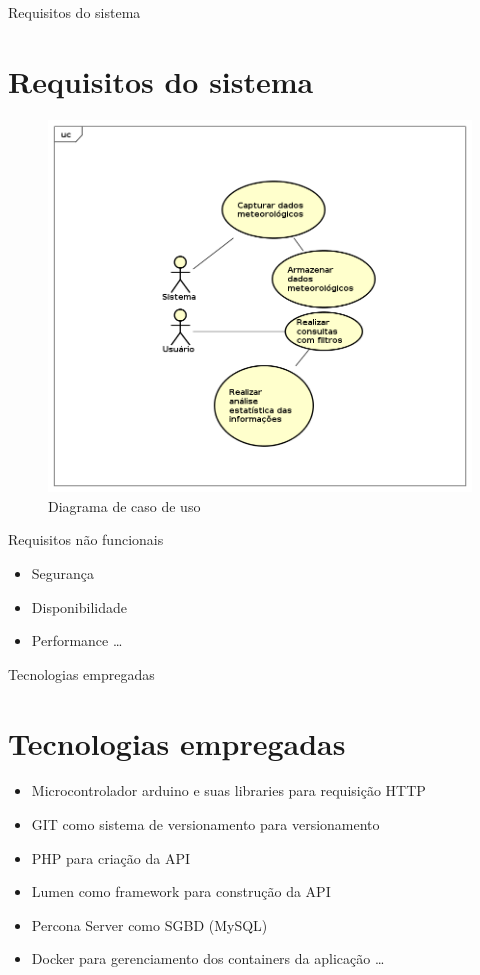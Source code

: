 \documentclass[aspectratio=43]{beamer}
\begin{document}
\begin{frame}{Requisitos do sistema}
\section{Requisitos do sistema}

\begin{figure}[!htb]
    \label{figure_diagrama_caso_uso}
    \centering
    \caption{Diagrama de caso de uso} \label{includegraphics_diagrama_caso_uso}
    \includegraphics[scale=0.3]{caso_de_uso.png}
    \hfill
\end{figure}
\end{frame}

\begin{frame}{Requisitos não funcionais}
\begin{itemize}
\item Segurança
\item Disponibilidade
\item Performance \ldots
\end{itemize}
\end{frame}

\begin{frame}{Tecnologias empregadas}
\section{Tecnologias empregadas}

\begin{itemize}
\item Microcontrolador arduino e suas libraries para requisição HTTP
\item GIT como sistema de versionamento para versionamento
\item PHP para criação da API
\item Lumen como framework para construção da API
\item Percona Server como SGBD (MySQL)
\item Docker para gerenciamento dos containers da aplicação \ldots
\end{itemize}
\end{frame}
\end{document}
